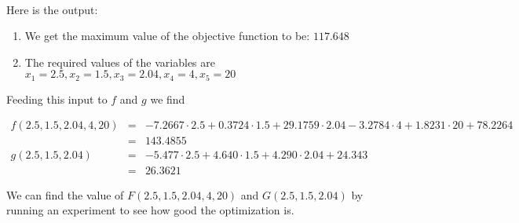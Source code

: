 \documentclass[11pt]{article}
\begin{document}
\paragraph{}
Here is the output:
\begin{enumerate}
\item We get the maximum value of the objective function to be: $117.648$
\item The required values of the variables are $x_1 = 2.5,x_2 = 1.5,x_3 = 2.04, x_4 = 4, x_5 = 20$
\end{enumerate}
Feeding this input to $f$ and $g$ we find
\begin{tiny}
\begin{eqnarray*}
f(2.5, 1.5, 2.04, 4,20) &=& -7.2667 \cdot 2.5 + 0.3724 \cdot 1.5 + 29.1759 \cdot 2.04 - 3.2784 \cdot 4 + 1.8231 \cdot 20 + 78.2264\\
&=& 143.4855\\
g(2.5, 1.5, 2.04) &=& -5.477 \cdot 2.5 + 4.640 \cdot 1.5 + 4.290  \cdot 2.04 + 24.343\\
&=& 26.3621
\end{eqnarray*}
\end{tiny}
We can find the value of $F(2.5, 1.5, 2.04, 4,20)$ and $G(2.5, 1.5, 2.04)$ by running an experiment to see how good the optimization is.
\end{document}

